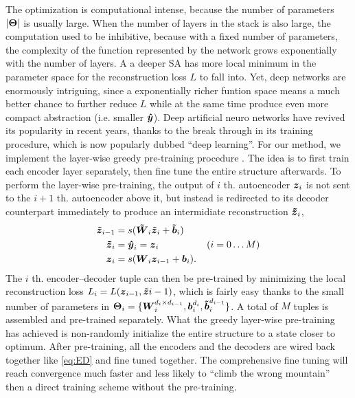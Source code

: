 {The optimization is computational intense, because the number of parameters $|\boldsymbol{\Theta}|$ is usually large. When the number of layers in the stack is also large, the computation used to be inhibitive, because with a fixed number of parameters, the complexity of the function represented by the network grows exponentially with the number of layers. A a deeper SA has more local minimum in the parameter space for the reconstruction loss $L$ to fall into. Yet, deep networks are enormously intriguing, since a exponentially richer funtion space means a much better chance to further reduce $L$ while at the same time produce even more compact abstraction (i.e. smaller $\boldsymbol{\hat{y}}$). Deep artificial neuro networks have revived its popularity in recent years, thanks to the break through in its training procedure, which is now popularly dubbed ``deep learning''. For our method, we implement the layer-wise greedy pre-training procedure \cite{DL:DBN1, DL:SDA1}. The idea is to first train each encoder layer separately, then fine tune the entire structure afterwards. To perform the layer-wise pre-training, the output of $i$ th. autoencoder $\boldsymbol{z}_i$ is not sent to the $i+1$ th. autoencoder above it, but instead is redirected to its decoder counterpart immediately to produce an intermidiate reconstruction $\boldsymbol{\tilde{z}}_i$, 
\begin{equation}\label{eq:Greedy}
  \begin{split}
    \boldsymbol{\tilde{z}}_{i-1} &= s(\boldsymbol{\tilde{W}}_i \boldsymbol{\tilde{z}}_i + \boldsymbol{\tilde{b}}_i) \\
    \boldsymbol{\tilde{z}}_{i  } &= \boldsymbol{\hat{y}}_i = \boldsymbol{z}_i \quad \quad \quad \quad \quad (i = 0 \dots M) \\
    \boldsymbol{z}_{i  } &= s(\boldsymbol{W}_i\boldsymbol{z}_{i-1} + \boldsymbol{b}_i). \\
  \end{split}
\end{equation}
The $i$ th. encoder--decoder tuple can then be pre-trained by minimizing the local reconstruction loss $L_i=L(\boldsymbol{z}_{i-1}, \boldsymbol{\tilde{z}}{i-1})$, which is fairly easy thanks to the small number of parameters in $\boldsymbol{\Theta}_i=\{\boldsymbol{W}_{i}^{d_{i} \times d_{i-1}}, \boldsymbol{b}_{i}^{d_{i}}, \boldsymbol{\tilde{b}}_{i}^{d_{i-1}}\}$. A total of $M$ tuples is assembled and pre-trained separately. What the greedy layer-wise pre-training has achieved is non-randomly initialize the entire structure to a state closer to optimum. After pre-training, all the encoders and the decoders are wired back together like \ref{eq:ED} and fine tuned together. The comprehensive fine tuning will reach convergence much faster and less likely to ``climb the wrong mountain'' then a direct training scheme without the pre-training.

}

